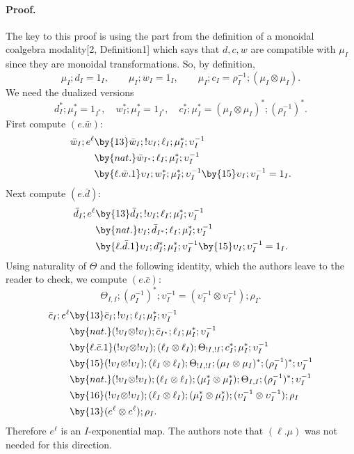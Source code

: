 \paragraph{Proof.}
The key to this proof is using the part from the definition of a monoidal coalgebra
modality[2, Definition1] which says that $d,c,w$ are compatible with $\mu_I$
since they are monoidal transformations. So, by definition,
\begin{equation}
\mu_I;d_I=1_I,\qquad \mu_I;w_I=1_I,\qquad
\mu_I;c_I=\rho_I^{-1};(\mu_I\otimes\mu_I).\tag{14}
\end{equation}
We need the dualized versions
\begin{equation}
d_I^*;\mu_I^*=1_{I^*},\quad
w_I^*;\mu_I^*=1_{I^*},\quad
c_I^*;\mu_I^*=(\mu_I\otimes\mu_I)^*;(\rho_I^{-1})^*.\tag{15}
\end{equation}
First compute $(e.\bar w)$:
\begin{align*}
\bar w_I;e^\ell
&\by{13}\bar w_I;!\upsilon_I;\ell_I;\mu_I^*;\upsilon_I^{-1}\\
&\by{nat.}\bar w_{I^*};\ell_I;\mu_I^*;\upsilon_I^{-1}\\
&\by{\ell.\bar w.1}\upsilon_I;w_I^*;\mu_I^*;\upsilon_I^{-1}
\by{15}\upsilon_I;\upsilon_I^{-1}=1_I.
\end{align*}
Next compute $(e.\bar d)$:
\begin{align*}
\bar d_I;e^\ell
&\by{13}\bar d_I;!\upsilon_I;\ell_I;\mu_I^*;\upsilon_I^{-1}\\
&\by{nat.}\upsilon_I;\bar d_{I^*};\ell_I;\mu_I^*;\upsilon_I^{-1}\\
&\by{\ell.\bar d.1}\upsilon_I;d_I^*;\mu_I^*;\upsilon_I^{-1}
\by{15}\upsilon_I;\upsilon_I^{-1}=1_I.
\end{align*}
Using naturality of $\Theta$ and the following identity, which the authors
leave to the reader to check, we compute $(e.\bar c)$:
\begin{equation}
\Theta_{I,I};(\rho_I^{-1})^*;\upsilon_I^{-1}
=(\upsilon_I^{-1}\otimes\upsilon_I^{-1});\rho_I.\tag{16}
\end{equation}
\begin{align*}
\bar c_I;e^\ell
&\by{13}\bar c_I;!\upsilon_I;\ell_I;\mu_I^*;\upsilon_I^{-1}\\
&\by{nat.}(!\upsilon_I\otimes!\upsilon_I);\bar c_{I^*};\ell_I;\mu_I^*;\upsilon_I^{-1}\\
&\by{\ell.\bar c.1}(!\upsilon_I\otimes!\upsilon_I);(\ell_I\otimes\ell_I);
\Theta_{!I,!I};c_I^*;\mu_I^*;\upsilon_I^{-1}\\
&\by{15}(!\upsilon_I\otimes!\upsilon_I);(\ell_I\otimes\ell_I);
\Theta_{!I,!I};(\mu_I\otimes\mu_I)^*;(\rho_I^{-1})^*;\upsilon_I^{-1}\\
&\by{nat.}(!\upsilon_I\otimes!\upsilon_I);(\ell_I\otimes\ell_I);
(\mu_I^*\otimes\mu_I^*);\Theta_{I,I};(\rho_I^{-1})^*;\upsilon_I^{-1}\\
&\by{16}(!\upsilon_I\otimes!\upsilon_I);(\ell_I\otimes\ell_I);
(\mu_I^*\otimes\mu_I^*);(\upsilon_I^{-1}\otimes\upsilon_I^{-1});\rho_I\\
&\by{13}(e^\ell\otimes e^\ell);\rho_I.
\end{align*}
Therefore $e^\ell$ is an $I$-exponential map. The authors note that
$(\ell.\mu)$ was not needed for this direction.

